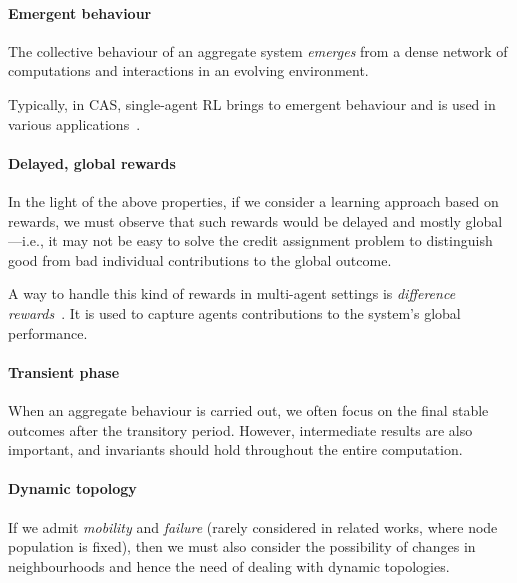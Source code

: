 \documentclass[conference]{IEEEtran}
\newcommand{\suggestions}[1]{\todo[inline, color=yellow]{#1}}
\begin{document}
%

\paragraph{Emergent behaviour}
%
The collective behaviour of an aggregate system
 \emph{emerges} 
 from a dense network of computations and interactions
 in an evolving environment.
%

Typically, in CAS, single-agent RL brings to emergent behaviour and is used in various applications~\cite{DBLP:conf/icse/DAngeloGGGNPT19}.

\paragraph{Delayed, global rewards}
%
In the light of the above properties,
 if we consider a learning approach based on rewards,
 we must observe that such rewards would be
 delayed and mostly global---i.e.,
 it may not be easy to solve the credit assignment problem
 to distinguish good from bad individual contributions
 to the global outcome.

A way to handle this kind of rewards in multi-agent settings is \textit{difference rewards}~\cite{DBLP:conf/atal/DevlinYKT14, DBLP:conf/aaai/FoersterFANW18}. It is used to capture agents contributions to the system's global performance.
\paragraph{Transient phase}
%
When an aggregate behaviour is carried out,
 we often focus on the final stable outcomes after the transitory period.
%
However, intermediate results are also important,
 and invariants should hold throughout the entire computation.

\paragraph{Dynamic topology}
%
If we admit \emph{mobility} and \emph{failure} (rarely considered in related works, where node population is fixed),
 then we must also consider
 the possibility of changes in neighbourhoods
 and hence the need of dealing with dynamic topologies.
\end{document}
